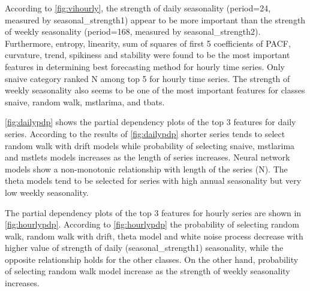 \documentclass[11pt,a4paper,]{article}
\begin{document}
According to \autoref{fig:vihourly}, the strength of daily seasonality
(period=24, measured by seasonal\_strength1) appear to be more important
than the strength of weekly seasonality (period=168, measured by
seasonal\_strength2). Furthermore, entropy, linearity, sum of squares of
first 5 coefficients of PACF, curvature, trend, spikiness and stability
were found to be the most important features in determining best
forecasting method for hourly time series. Only snaive category ranked N
among top 5 for hourly time series. The strength of weekly seasonality
also seems to be one of the most important features for classes snaive,
random walk, mstlarima, and tbats.

\autoref{fig:dailypdp} shows the partial dependency plots of the top 3
features for daily series. According to the results of
\autoref{fig:dailypdp} shorter series tends to select random walk with
drift models while probability of selecting snaive, mstlarima and
mstlets models increases as the length of series increases. Neural
network models show a non-monotonic relationship with length of the
series (N). The theta models tend to be selected for series with high
annual seasonality but very low weekly seasonality.

The partial dependency plots of the top 3 features for hourly series are
shown in \autoref{fig:hourlypdp}. According to \autoref{fig:hourlypdp}
the probability of selecting random walk, random walk with drift, theta
model and white noise process decrease with higher value of strength of
daily (seasonal\_strength1) seasonality, while the opposite relationship
holds for the other classes. On the other hand, probability of selecting
random walk model increase as the strength of weekly seasonality
increases.
\end{document}
